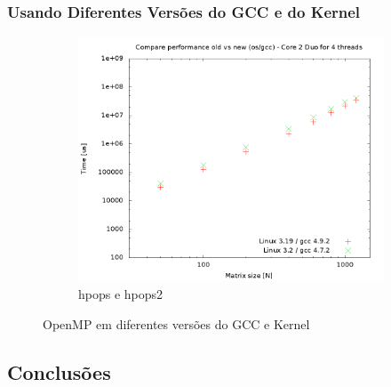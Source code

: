 \documentclass[a4paper, 12pt]{article}
\begin{document}
\newpage
\subsubsection{Usando Diferentes Versões do GCC e do Kernel}
\begin{figure}[H]
    \centering
    \begin{subfigure}[H]{0.5\textwidth}
        \includegraphics[width=\textwidth]{compare_old_new_os}
        \caption{hpops e hpops2}
        \label{fig:hpops_hpops2}
    \end{subfigure}%
    \caption{OpenMP em diferentes versões do GCC e Kernel}\label{fig:animals}
\end{figure}
\subsection{Conclusões} \label{sec:dis}

%
%
\end{document}
